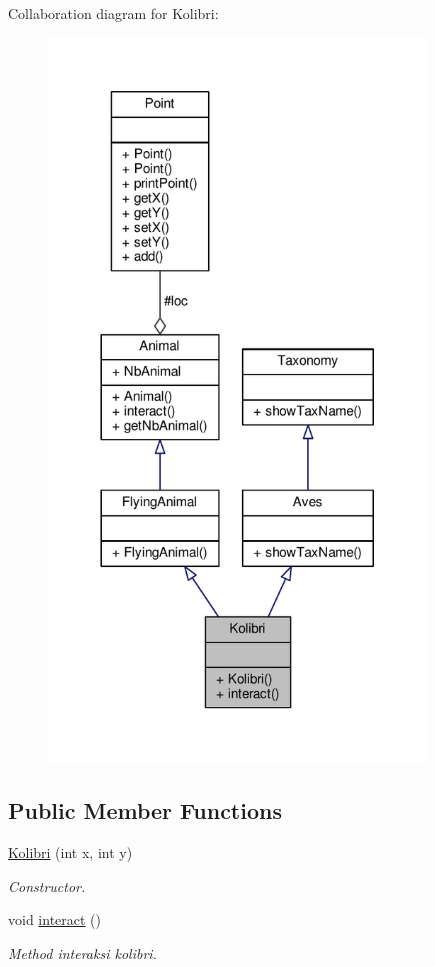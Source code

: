 Collaboration diagram for Kolibri\+:
\nopagebreak
\begin{figure}[H]
\begin{center}
\leavevmode
\includegraphics[width=284pt]{classKolibri__coll__graph}
\end{center}
\end{figure}
\subsection*{Public Member Functions}
\begin{DoxyCompactItemize}
\item 
\hyperlink{classKolibri_ae4af707d315c614de90cd7be073215f9}{Kolibri} (int x, int y)
\begin{DoxyCompactList}\small\item\em Constructor. \end{DoxyCompactList}\item 
void \hyperlink{classKolibri_aea697342d51b3946dfcf07ab905492a6}{interact} ()\hypertarget{classKolibri_aea697342d51b3946dfcf07ab905492a6}{}\label{classKolibri_aea697342d51b3946dfcf07ab905492a6}

\begin{DoxyCompactList}\small\item\em Method interaksi kolibri. \end{DoxyCompactList}\end{DoxyCompactItemize}
